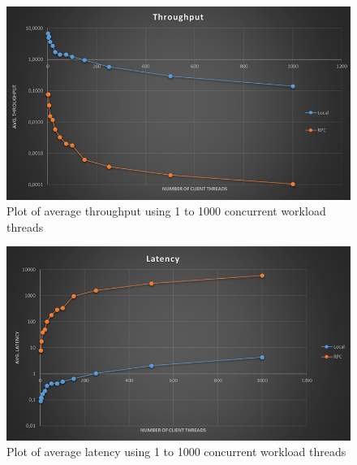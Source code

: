 \documentclass[10pt,a4paper]{article}
\begin{document}
\begin{enumerate}
	\begin{center}
		\begin{figure}[h!]
				\includegraphics[scale=0.6]{throughput.png}
				\caption{Plot of average throughput using 1 to 1000 concurrent workload threads}
				\label{fig1}
		\end{figure}
		\begin{figure}[h!]
				\includegraphics[scale=0.6]{latency.png}
				\caption{Plot of average latency using 1 to 1000 concurrent workload threads}				
				\label{fig2}
		\end{figure}
	\end{center}
\end{enumerate}
\end{document}
